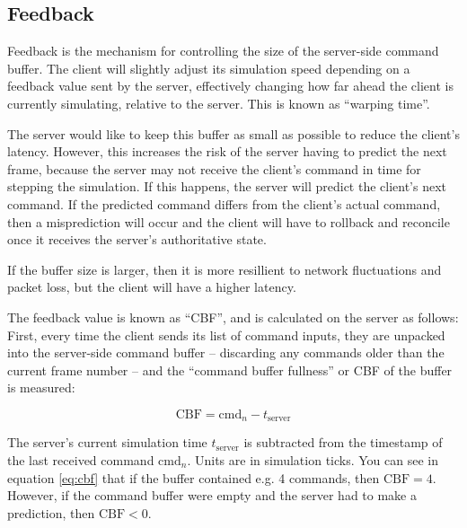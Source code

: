 \subsection{Feedback}

Feedback is the mechanism for controlling  the size of the server-side command
buffer. The  client  will  slightly adjust its simulation speed depending on a
feedback value sent by the server,  effectively  changing  how  far  ahead  the
client  is  currently  simulating,  relative  to the server. This is  known  as
``warping time''.

\begin{center}

\end{center}

The server would like to keep this buffer  as  small as possible to reduce the
client's latency. However, this increases the risk  of  the  server  having to
predict  the  next frame, because the server  may  not  receive  the  client's
command in time for stepping the simulation. If  this happens, the server will
predict  the client's next command. If the predicted command differs  from  the
client's actual command, then a misprediction  will  occur  and the client will
have to rollback and  reconcile  once  it  receives  the server's authoritative
state.

If  the  buffer  size  is  larger,  then  it  is  more  resillient  to network
fluctuations and packet loss, but the client will have a higher latency.

The feedback value is known as  ``CBF'',  and  is  calculated  on the server as
follows: First, every time the  client  sends  its list of command inputs, they
are unpacked into  the  server-side  command  buffer -- discarding any commands
older  than the current frame number -- and the ``command buffer fullness''  or
CBF of the buffer is measured:

\begin{equation}
    \text{CBF} = \text{cmd}_n - t_{\text{server}}
    \label{eq:cbf}
\end{equation}

The server's current simulation time $t_{\text{server}}$ is subtracted from the
timestamp of the last received command $\text{cmd}_n$. Units are in  simulation
ticks. You can see in equation \ref{eq:cbf} that if the buffer contained e.g. 4
commands,  then  $\text{CBF}=4$.  However, if the command buffer were empty and
the server had to make a prediction, then $\text{CBF}<0$.

